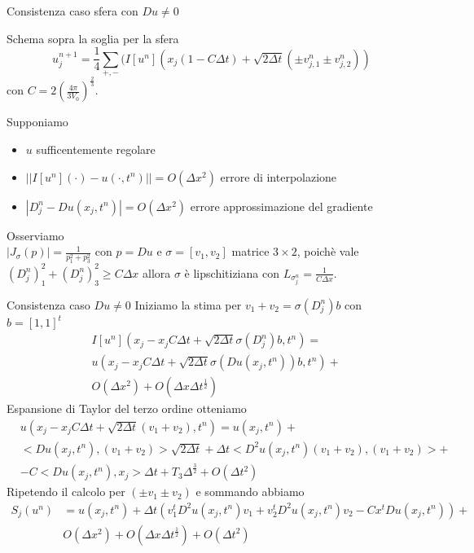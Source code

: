 \begin{frame}{Consistenza caso sfera con $Du\neq 0$}
  \begin{alertblock}{Schema sopra la soglia per la sfera}
   \[
     u_j^{n+1}=\frac{1}{4}\sum_{+,-}(I[u^n](x_j(1-C\Delta
     t)+\sqrt{2\Delta t}(\pm v_{j,1}^n\pm v_{j,2}^n))
    \]
    con $C=2\left(\frac{4\pi}{3V_0}\right)^\frac{2}{3}$.
  \end{alertblock}
  Supponiamo
  \begin{itemize}
    \item $u$ sufficentemente regolare
    \item $||I[u^n](\cdot)-u(\cdot,t^n)||=O(\Delta x^2)$ errore di
      interpolazione 
    \item $|D_j^n-Du(x_j,t^n)|=O(\Delta x^2)$ errore approssimazione
      del gradiente
   \end{itemize}
  Osserviamo \\ 
      $|J_{\sigma}(p)|=\frac{1}{p_1^2+p_3^2}$ con $p=Du$ e
      $\sigma=[v_1,v_2]$ matrice $3\times 2$,  poichè vale
      $(D_j^n)_1^2+(D_j^n)_3^2\geq C\Delta x$ allora $\sigma$ è
      lipschitiziana con $L_{\sigma_j^n}=\frac{1}{C\Delta x}$.  
 \end{frame}

\begin{frame}{Consistenza caso $Du\neq 0$}
Iniziamo la stima per \alert{$v_1+v_2=\sigma(D_j^n)b$} con $b=[1,1]^t$
\[
\begin{aligned}
  &I[u^n](x_j-x_jC\Delta t +\sqrt{2\Delta t}\sigma(D_j^n)b,t^n)=\\
  &u(x_j-x_jC\Delta t +\sqrt{2\Delta t}\sigma(Du(x_j,t^n))b,t^n)+\\
  &O(\Delta x^2) + O(\Delta x\Delta t^{\frac{1}{2}}) 
\end{aligned}
\]
Espansione di Taylor del terzo ordine otteniamo
\[
\begin{aligned}
&u(x_j-x_jC\Delta t +\sqrt{2\Delta
    t}(v_1+v_2),t^n)=u(x_j,t^n)+\\
&<Du(x_j,t^n),(v_1+v_2)>\sqrt{2\Delta t}+\Delta
  t<D^2u(x_j,t^n)(v_1+v_2),(v_1+v_2)>+\\
&-C<Du(x_j,t^n),x_j>\Delta t+T_3\Delta^{\frac{3}{2}} +O(\Delta t^2)
\end{aligned}
\]
Ripetendo il calcolo per $(\pm v_1\pm v_2)$ e sommando abbiamo
\[
\begin{aligned}
S_j(u^n)&=u(x_j,t^n)+\Delta t(v_1^tD^2u(x_j,t^n)v_1+v_2^tD^2u(x_j,t^n)v_2-Cx^tDu(x_j,t^n))+\\
&O(\Delta x^2)+ O(\Delta x\Delta t^{\frac{1}{2}})+ O(\Delta t^2)
\end{aligned}
\]
\end{frame}

